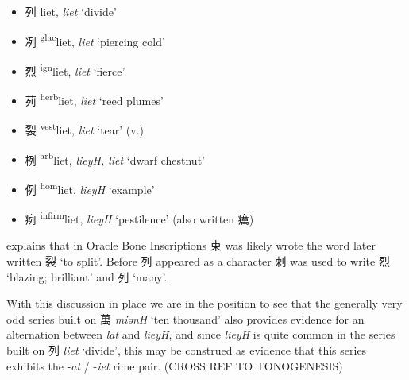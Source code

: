 \medskip
\begin{itemize}
  \item {\Large{列}} %
    {\large{liet}},
    \textit{liet} `divide' %

  \item {\Large{冽}} %
    {\large{{\textsuperscript{glac}}liet}},
    \textit{liet} `piercing cold' %


  \item {\Large{烈}} %
    {\large{{\textsuperscript{ign}}liet}},
    \textit{liet} `fierce' %

  \item {\Large{茢}} %
    {\large{{\textsuperscript{herb}}liet}},
    \textit{liet} `reed plumes' %

  \item {\Large{裂}} %
    {\large{{\textsuperscript{vest}}liet}},
    \textit{liet} `tear' (v.) %

  \item {\Large{栵}} %
    {\large{{\textsuperscript{arb}}liet}},
    \textit{lieyH, liet} `dwarf chestnut' %

  \item {\Large{例}} %
    {\large{{\textsuperscript{hom}}liet}},
    \textit{lieyH} `example' %

  \item {\Large{㾐}} %
    {\large{{\textsuperscript{infirm}}liet}},
    \textit{lieyH} `pestilence' (also written 癘) %
\end{itemize}

\citet[115-119]{Chen2024}
explains that in Oracle Bone Inscriptions 束 was likely wrote the word later written 裂 `to split'. Before 列 appeared as a character 剌 was used to write 烈 `blazing; brilliant' and 列 `many'. 

With this discussion in place we are in the position to see that the generally very odd series built on 萬 \textit{miənH} `ten thousand' also provides evidence for an alternation between \textit{lat} and \textit{lieyH}, and since \textit{lieyH} is quite common in the series built on 列  \textit{liet} `divide', this may be construed as evidence that this series exhibits the -\textit{at} / -\textit{iet} rime pair. (CROSS REF TO TONOGENESIS)





